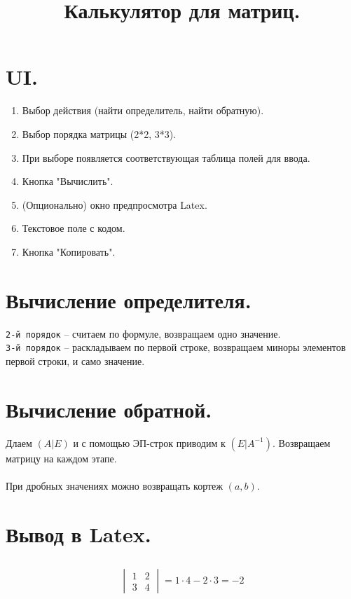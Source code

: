 \documentclass[a4paper, 14pt]{article}
\title{Калькулятор для матриц.}
\date{}
\begin{document}
\maketitle
\section{UI.}
\begin{enumerate}
    \item Выбор действия (найти определитель, найти обратную). 
    \item Выбор порядка матрицы (2*2, 3*3).
    \item При выборе появляется соответствующая таблица полей для ввода. 
    \item Кнопка "Вычислить".
    \item (Опционально) окно предпросмотра Latex.
    \item Текстовое поле с кодом.
    \item Кнопка "Копировать".
\end{enumerate}
\section{Вычисление определителя.}
\texttt{2-й порядок} -- считаем по формуле, возвращаем одно значение. \\ 
\texttt{3-й порядок} -- раскладываем по первой строке, возвращаем миноры элементов первой строки, и само значение. \\
\section{Вычисление обратной.} 
Длаем $(A|E)$ и с помощью ЭП-строк приводим к $(E|A^{-1})$. Возвращаем матрицу на каждом этапе. \\ \\
При дробных значениях можно возвращать кортеж $(a, b)$. 
\section{Вывод в Latex.} 
\subsection{}
\[
    \begin{vmatrix}
        1&2 \\ 3&4
    \end{vmatrix}
    =1\cdot 4 - 2 \cdot 3=-2
\]
\end{document}
